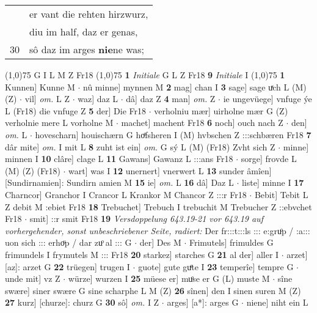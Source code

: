 \documentclass[8pt,a4paper,notitlepage]{article}
\begin{document}
\begin{table}[ht]
\begin{minipage}[t]{0.5\linewidth}
\begin{tabular}{rl}
 & er vant die rehten hirzwurz,\\ 
 & diu im half, daz er genas,\\ 
30 & sô daz im arges \textbf{nie}ne was;\\ 
\end{tabular}
\scriptsize
\line(1,0){75} \newline
G I L M Z Fr18 \newline
\line(1,0){75} \newline
\textbf{1} \textit{Initiale} G L Z Fr18  \textbf{9} \textit{Initiale} I  \newline
\line(1,0){75} \newline
\textbf{1} Kunnen] Kunne M  $\cdot$ nû minne] mynnen M \textbf{2} mag] chan I \textbf{3} sage] sage uͯch L (M) (Z)  $\cdot$ vil] \textit{om.} L Z  $\cdot$ waz] daz L  $\cdot$ dâ] daz Z \textbf{4} man] \textit{om.} Z  $\cdot$ ie ungevüege] vnfuge ýe L (Fr18) die vnfuge Z \textbf{5} der] Die Fr18  $\cdot$ verholniu mær] uirholne mær G (Z) verholnie mere L vorholne M  $\cdot$ machet] machent Fr18 \textbf{6} noch] ouch nach Z  $\cdot$ den] \textit{om.} L  $\cdot$ hovescharn] houischærn G hoͤfsheren I (M) hvbschen Z :::schbæren Fr18 \textbf{7} dâr mite] \textit{om.} I mit L \textbf{8} zuht ist ein] \textit{om.} G sý L (M) (Fr18) Zvht sich Z  $\cdot$ minne] minnen I \textbf{10} clâre] clage L \textbf{11} Gawans] Gawanz L :::ans Fr18  $\cdot$ sorge] frovde L (M) (Z) (Fr18)  $\cdot$ wart] was I \textbf{12} unernert] vnerwert L \textbf{13} sunder âmîen] [Sundirnamien]: Sundirn amien M \textbf{15} ie] \textit{om.} L \textbf{16} dâ] Daz L  $\cdot$ liste] minne I \textbf{17} Charncor] Granchor I Crancor L Krankor M Chancor Z :::r Fr18  $\cdot$ Bebit] Tebit L Z debit M :ebiet Fr18 \textbf{18} Trebuchet] Trebuch I trebuchit M Trebucher Z ::ebvchet Fr18  $\cdot$ smit] ::r smit Fr18 \textbf{19} \textit{Versdoppelung 643.19-21 vor 643.19 auf vorhergehender, sonst unbeschriebener Seite, radiert:} Der fr:::t:::ls ::: e:gruͦp / :a::: uon sich ::: erhoͧp / dar zuͦ al ::: G   $\cdot$ der] Des M  $\cdot$ Frimutels] frimuldes G frimundels I frymutels M ::: Fr18 \textbf{20} starkez] starches G \textbf{21} al der] aller I  $\cdot$ arzet] [az]: arzet G \textbf{22} trüegen] trugen I  $\cdot$ guote] gute guͤte I \textbf{23} temperîe] tempre G  $\cdot$ unde mit] vz Z  $\cdot$ würze] wurzen I \textbf{25} müese er] muͦse er G (L) muste M  $\cdot$ sîne swære] siner swære G sine scharphe L M (Z) \textbf{26} sînen] den I sinen suren M (Z) \textbf{27} kurz] [churze]: churz G \textbf{30} sô] \textit{om.} I Z  $\cdot$ arges] [a*]: arges G  $\cdot$ niene] niht ein L \newline

\end{minipage}
\end{table}
\end{document}
